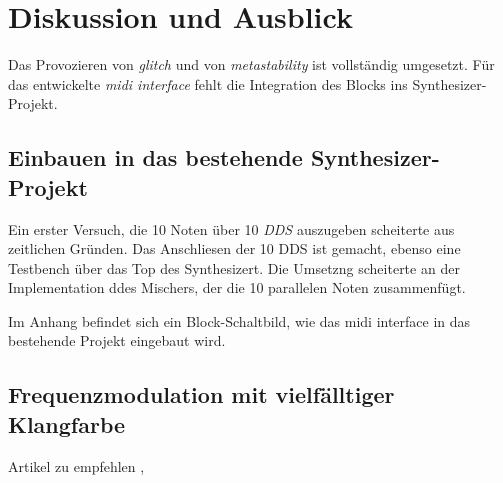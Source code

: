 
\chapter{Diskussion und Ausblick}\label{chap.diskussion}

Das Provozieren von \textit{glitch} und von \textit{metastability} ist vollständig umgesetzt. Für das entwickelte \textit{midi interface} fehlt die Integration des Blocks ins Synthesizer-Projekt. 

\section{Einbauen in das bestehende Synthesizer-Projekt}

Ein erster Versuch, die 10 Noten über 10 \textit{DDS} auszugeben scheiterte aus zeitlichen Gründen. Das Anschliesen der 10 DDS ist gemacht, ebenso eine Testbench über das Top des Synthesizert. Die Umsetzng scheiterte an der Implementation ddes Mischers, der die 10 parallelen Noten zusammenfügt.

Im Anhang befindet sich ein Block-Schaltbild, wie das midi interface in das bestehende Projekt eingebaut wird. 

\section{Frequenzmodulation mit vielfälltiger Klangfarbe}
Artikel zu empfehlen \cite{synthesizer_1}, \cite{synthesizer_2}

